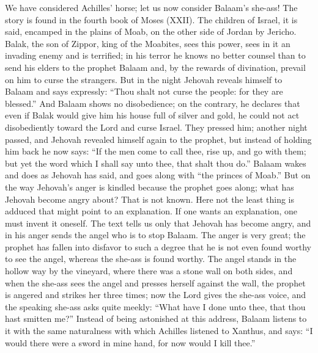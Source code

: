 \documentclass[12pt]{book}
\newcommand{\opage}[1]{\marginnote{\footnotesize\textit{[#1]}}}
\begin{document}
We have considered Achilles' horse; let us now consider Balaam's
she-ass! The story is found in the fourth book of Moses (XXII). The
children of Israel, it is said, encamped in the plains of Moab, on the
other side of Jordan by Jericho. Balak, the son of Zippor, king of the
Moabites, sees this power, sees in it an invading enemy and is
terrified; in his terror he knows no better counsel than to send his
elders to the prophet Balaam and, by the rewards of divination, prevail
on him to curse the strangers. But in the night Jehovah reveals himself
to Balaam and says expressly: ``Thou shalt not curse the people: for
they are blessed.'' And Balaam shows no disobedience; on the contrary,
he declares that even if Balak would give him his house full of silver
and gold, he could not act disobediently toward the Lord and curse
Israel. They pressed him; another night passed, and Jehovah revealed
himself again to the prophet, but instead of holding him back he now
says: ``If the men come to call thee, rise up, and go with them; but
yet the word which I shall say unto thee, that shalt thou do.'' Balaam
wakes and does as Jehovah has said, and goes along with ``the princes
of Moab.'' But on the way Jehovah's anger is kindled because the
prophet goes along; what has Jehovah become angry about? That is not
known. Here not the least thing is adduced that might point to an
explanation. If one wants an explanation, one must invent it oneself.
The text tells us only that Jehovah has become angry, and in his anger
sends the angel who is to stop Balaam. The anger is very great; the
prophet has fallen into disfavor to such a degree that he is not even
found worthy to see
\opage{158}\setcounter{footnote}{0}%
the angel, whereas the she-ass is found worthy. The angel stands in the
hollow way by the vineyard, where there was a stone wall on both sides,
and when the she-ass sees the angel and presses herself against the
wall, the prophet is angered and strikes her three times; now the Lord
gives the she-ass voice, and the speaking she-ass asks quite meekly:
``What have I done unto thee, that thou hast smitten me?''
Instead of being astonished at this address, Balaam listens to it with
the same naturalness with which Achilles listened to Xanthus, and says:
``I would there were a sword in mine hand, for now would I kill thee.''
\end{document}
